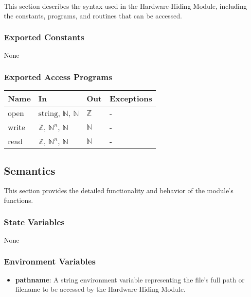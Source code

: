 \documentclass[12pt, titlepage]{article}
\begin{document}
This section describes the syntax used in the Hardware-Hiding Module, including
the constants, programs, and routines that can be accessed.

\subsubsection{Exported Constants}

None

\subsubsection{Exported Access Programs}

\begin{center}
\begin{tabular}{p{2cm} p{4cm} p{4cm} p{2cm}}
\hline
\textbf{Name} & \textbf{In} & \textbf{Out} & \textbf{Exceptions} \\
\hline
open & $\text{string}$, $\mathbb{N}$, $\mathbb{N}$ & $\mathbb{Z}$ & - \\
write & $\mathbb{Z}$, $\mathbb{N}^n$, $\mathbb{N}$ & $\mathbb{N}$ & - \\
read & $\mathbb{Z}$, $\mathbb{N}^n$, $\mathbb{N}$ & $\mathbb{N}$ & - \\
\hline
\end{tabular}
\end{center}

\subsection{Semantics}

This section provides the detailed functionality and behavior of the module’s
functions.

\subsubsection{State Variables}

None

\subsubsection{Environment Variables}

\begin{itemize}
    \item \textbf{pathname}: A string environment variable representing the
    file's full path or filename to be accessed by the Hardware-Hiding Module.
\end{itemize}
\end{document}
